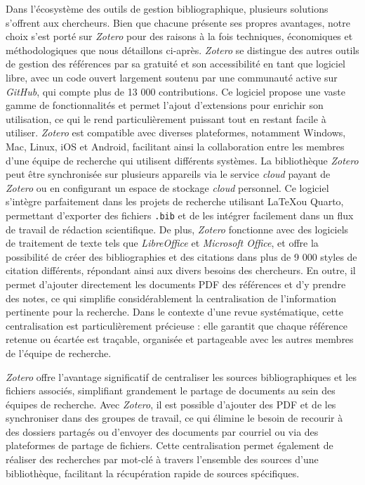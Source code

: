 \documentclass[
  letterpaper,
  DIV=11,
  numbers=noendperiod,
  oneside]{scrreprt}
\begin{document}
Dans l'écosystème des outils de gestion bibliographique, plusieurs
solutions s'offrent aux chercheurs. Bien que chacune présente ses
propres avantages, notre choix s'est porté sur \emph{Zotero} pour des
raisons à la fois techniques, économiques et méthodologiques que nous
détaillons ci-après. \emph{Zotero} se distingue des autres outils de
gestion des références par sa gratuité et son accessibilité en tant que
logiciel libre, avec un code ouvert largement soutenu par une communauté
active sur \emph{GitHub}, qui compte plus de 13 000 contributions. Ce
logiciel propose une vaste gamme de fonctionnalités et permet l'ajout
d'extensions pour enrichir son utilisation, ce qui le rend
particulièrement puissant tout en restant facile à utiliser.
\emph{Zotero} est compatible avec diverses plateformes, notamment
Windows, Mac, Linux, iOS et Android, facilitant ainsi la collaboration
entre les membres d'une équipe de recherche qui utilisent différents
systèmes. La bibliothèque \emph{Zotero} peut être synchronisée sur
plusieurs appareils via le service \emph{cloud} payant de \emph{Zotero}
ou en configurant un espace de stockage \emph{cloud} personnel. Ce
logiciel s'intègre parfaitement dans les projets de recherche utilisant
\LaTeX ou Quarto, permettant d'exporter des fichiers \texttt{.bib} et de
les intégrer facilement dans un flux de travail de rédaction
scientifique. De plus, \emph{Zotero} fonctionne avec des logiciels de
traitement de texte tels que \emph{LibreOffice} et \emph{Microsoft
Office}, et offre la possibilité de créer des bibliographies et des
citations dans plus de 9 000 styles de citation différents, répondant
ainsi aux divers besoins des chercheurs. En outre, il permet d'ajouter
directement les documents PDF des références et d'y prendre des notes,
ce qui simplifie considérablement la centralisation de l'information
pertinente pour la recherche. Dans le contexte d'une revue systématique,
cette centralisation est particulièrement précieuse : elle garantit que
chaque référence retenue ou écartée est traçable, organisée et
partageable avec les autres membres de l'équipe de recherche.

\emph{Zotero} offre l'avantage significatif de centraliser les sources
bibliographiques et les fichiers associés, simplifiant grandement le
partage de documents au sein des équipes de recherche. Avec
\emph{Zotero}, il est possible d'ajouter des PDF et de les synchroniser
dans des groupes de travail, ce qui élimine le besoin de recourir à des
dossiers partagés ou d'envoyer des documents par courriel ou via des
plateformes de partage de fichiers. Cette centralisation permet
également de réaliser des recherches par mot-clé à travers l'ensemble
des sources d'une bibliothèque, facilitant la récupération rapide de
sources spécifiques.
\end{document}
